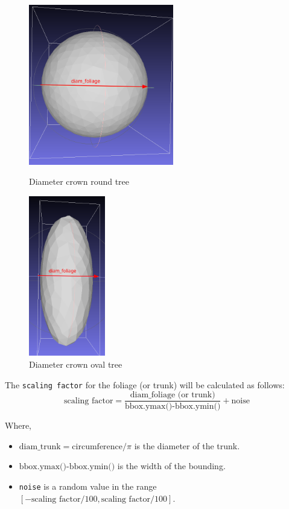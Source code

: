 \documentclass[12pt]{article}
\begin{document}
\begin{figure}[H]
    \centering
    \begin{minipage}{0.45\textwidth}
        \centering
        \includegraphics[height=7cm]{images/diam_foliage_round.png}
        \caption{Diameter crown round tree}
    \end{minipage}
    \begin{minipage}{0.45\textwidth}
        \centering
        \includegraphics[height=7cm]{images/diam_foliage_oval.png}
        \caption{Diameter crown oval tree}
    \end{minipage}
\end{figure}

The \texttt{scaling factor} for the foliage (or trunk) will be calculated as follows:
\begin{equation}
    \text{scaling factor} = \frac{\text{diam\_foliage (or trunk)}}{\text{bbox.ymax()-bbox.ymin()}} + \text{noise}
\end{equation}


Where,
\begin{itemize}
    \item $\text{diam\_trunk} = \text{circumference} / \pi$ is the diameter of the trunk.
    \item $\text{bbox.ymax()-bbox.ymin()}$ is the width of the bounding.
    \item \texttt{noise} is a random value in the range 
    $[-\text{scaling factor} / 100, \text{scaling factor} / 100]$.
\end{itemize}
\end{document}
